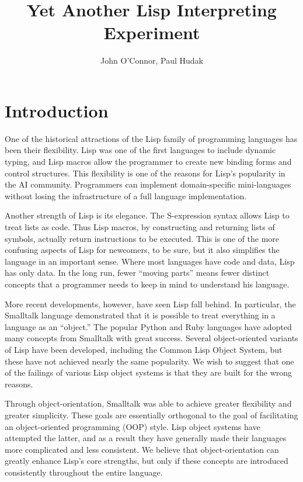 \documentclass[twocolumn]{article}
\title{Yet Another Lisp Interpreting Experiment}
\author{John O'Connor, Paul Hudak}
\date{}
\begin{document}
\newcommand{\next}{\operatorname{next}}
\newcommand{\invoke}{\operatorname{invoke}}
\newcommand{\lookup}{\operatorname{lookup}}
\newcommand{\wrap}{\operatorname{wrap}}
\newcommand{\parse}{\operatorname{parse}}

\newcommand{\eval}{\texttt{eval}}
\newcommand{\call}{\texttt{call}}
\newcommand{\msg}{\texttt{msg}}

\newcommand{\lb}{\left<}
\newcommand{\rb}{\right>}

\maketitle

\section*{Introduction}
One of the historical attractions of the Lisp family of programming
languages has been their flexibility. Lisp was one of the first
languages to include dynamic typing, and Lisp macros allow the
programmer to create new binding forms and control structures. This
flexibility is one of the reasons for Lisp's popularity in the AI
community. Programmers can implement domain-specific mini-languages
without losing the infrastructure of a full language implementation.

Another strength of Lisp is its elegance. The S-expression syntax
allows Lisp to treat lists as code. Thus Lisp macros, by constructing
and returning lists of symbols, actually return instructions to be
executed. This is one of the more confusing aspects of Lisp for
newcomers, to be sure, but it also simplifies the language in an
important sense. Where most languages have code and data, Lisp has
only data. In the long run, fewer ``moving parts'' means fewer
distinct concepts that a programmer needs to keep in mind to
understand his language.

More recent developments, however, have seen Lisp fall behind. In
particular, the Smalltalk language demonstrated that it is possible to
treat everything in a language as an ``object.'' The popular Python
and Ruby languages have adopted many concepts from Smalltalk with
great success. Several object-oriented variants of Lisp have been
developed, including the Common Lisp Object System, but these have not
achieved nearly the same popularity. We wish to suggest that one of
the failings of various Lisp object systems is that they are built for
the wrong reasons.

Through object-orientation, Smalltalk was able to achieve greater
flexibility and greater simplicity. These goals are essentially
orthogonal to the goal of facilitating an object-oriented programming
(OOP) style. Lisp object systems have attempted the latter, and as a
result they have generally made their languages more complicated and
less consistent. We believe that object-orientation can greatly
enhance Lisp's core strengths, but only if these concepts are
introduced consistently throughout the entire language.
\end{document}
